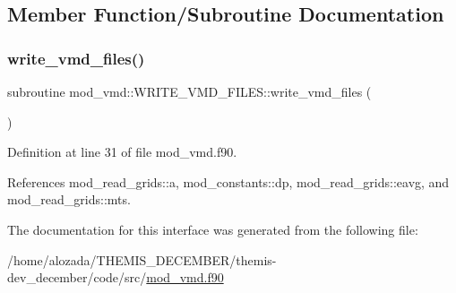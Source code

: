 \subsection{Member Function/\+Subroutine Documentation}
\mbox{\label{interfacemod__vmd_1_1WRITE__VMD__FILES_ad1dbc2549621cc00c913efdb675ab715}} 
\subsubsection{\texorpdfstring{write\+\_\+vmd\+\_\+files()}{write\_vmd\_files()}}
{\footnotesize\ttfamily subroutine mod\+\_\+vmd\+::\+W\+R\+I\+T\+E\+\_\+\+V\+M\+D\+\_\+\+F\+I\+L\+E\+S\+::write\+\_\+vmd\+\_\+files (\begin{DoxyParamCaption}{ }\end{DoxyParamCaption})}



Definition at line 31 of file mod\+\_\+vmd.\+f90.



References mod\+\_\+read\+\_\+grids\+::a, mod\+\_\+constants\+::dp, mod\+\_\+read\+\_\+grids\+::eavg, and mod\+\_\+read\+\_\+grids\+::mts.



The documentation for this interface was generated from the following file\+:\begin{DoxyCompactItemize}
\item 
/home/alozada/\+T\+H\+E\+M\+I\+S\+\_\+\+D\+E\+C\+E\+M\+B\+E\+R/themis-\/dev\+\_\+december/code/src/\hyperlink{mod__vmd_8f90}{mod\+\_\+vmd.\+f90}\end{DoxyCompactItemize}
